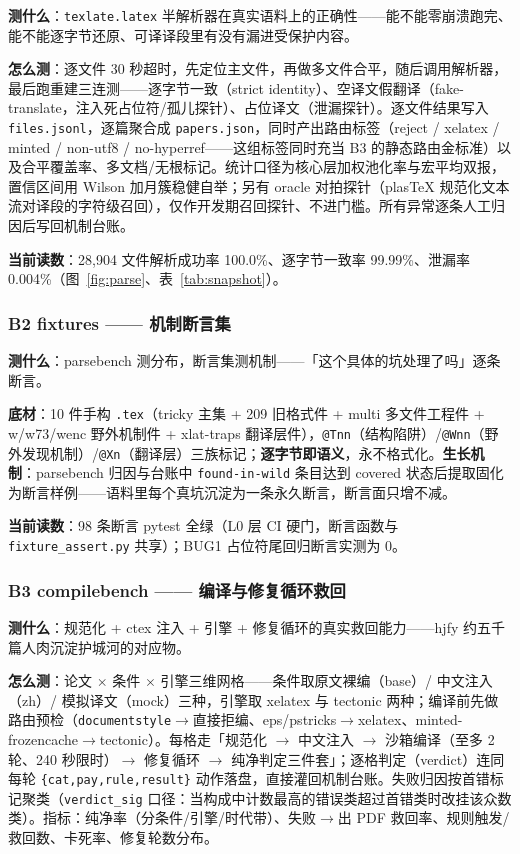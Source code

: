 \textbf{测什么}：\texttt{texlate.latex} 半解析器在真实语料上的正确性——能不能零崩溃跑完、能不能逐字节还原、可译译段里有没有漏进受保护内容。

\textbf{怎么测}：逐文件 30 秒超时，先定位主文件，再做多文件合平，随后调用解析器，最后跑重建三连测——逐字节一致（strict identity）、空译文假翻译（fake-translate，注入死占位符/孤儿探针）、占位译文（泄漏探针）。逐文件结果写入 \texttt{files.jsonl}，逐篇聚合成 \texttt{papers.json}，同时产出路由标签（reject / xelatex / minted / non-utf8 / no-hyperref——这组标签同时充当 B3 的静态路由金标准）以及合平覆盖率、多文档/无根标记。统计口径为核心层加权池化率与宏平均双报，置信区间用 Wilson 加月簇稳健自举；另有 oracle 对拍探针（plasTeX 规范化文本流对译段的字符级召回），仅作开发期召回探针、不进门槛。所有异常逐条人工归因后写回机制台账。

\textbf{当前读数}：28{,}904 文件解析成功率 100.0\%、逐字节一致率 99.99\%、泄漏率 0.004\%（图~\ref{fig:parse}、表~\ref{tab:snapshot}）。

\subsubsection{B2 fixtures —— 机制断言集}

\textbf{测什么}：parsebench 测分布，断言集测机制——「这个具体的坑处理了吗」逐条断言。

\textbf{底材}：10 件手构 \texttt{.tex}（tricky 主集 + 209 旧格式件 + multi 多文件工程件 + w/w73/wenc 野外机制件 + xlat-traps 翻译层件），\texttt{@Tnn}（结构陷阱）/\texttt{@Wnn}（野外发现机制）/\texttt{@Xn}（翻译层）三族标记；\textbf{逐字节即语义}，永不格式化。\textbf{生长机制}：parsebench 归因与台账中 \texttt{found-in-wild} 条目达到 covered 状态后提取固化为断言样例——语料里每个真坑沉淀为一条永久断言，断言面只增不减。

\textbf{当前读数}：98 条断言 pytest 全绿（L0 层 CI 硬门，断言函数与 \texttt{fixture\_assert.py} 共享）；BUG1 占位符尾回归断言实测为 0。

\subsubsection{B3 compilebench —— 编译与修复循环救回}

\textbf{测什么}：规范化 + ctex 注入 + 引擎 + 修复循环的真实救回能力——hjfy 约五千篇人肉沉淀护城河的对应物。

\textbf{怎么测}：论文 $\times$ 条件 $\times$ 引擎三维网格——条件取原文裸编（base）/ 中文注入（zh）/ 模拟译文（mock）三种，引擎取 xelatex 与 tectonic 两种；编译前先做路由预检（\texttt{documentstyle}$\to$直接拒编、eps/pstricks$\to$xelatex、minted-frozencache$\to$tectonic）。每格走「规范化 $\to$ 中文注入 $\to$ 沙箱编译（至多 2 轮、240 秒限时）$\to$ 修复循环 $\to$ 纯净判定三件套」；逐格判定（verdict）连同每轮 \texttt{\{cat,pay,rule,result\}} 动作落盘，直接灌回机制台账。失败归因按首错标记聚类（\texttt{verdict\_sig} 口径：当构成中计数最高的错误类超过首错类时改挂该众数类）。指标：纯净率（分条件/引擎/时代带）、失败$\to$出 PDF 救回率、规则触发/救回数、卡死率、修复轮数分布。

